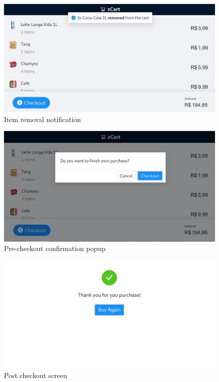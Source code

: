 \begin{figure}[H]
	\centering
	\caption[Item removal notification]{Item removal notification}
	\includegraphics[width=1\textwidth]{./images/userapp3.png}
    \fonte{}
\end{figure}

\begin{figure}[H]
	\centering
	\caption[Pre-checkout confirmation popup]{Pre-checkout confirmation popup}
	\includegraphics[width=1\textwidth]{./images/userapp4.png}
    \fonte{}
\end{figure}

\begin{figure}[H]
	\centering
	\caption[Post checkout screen]{Post checkout screen}
	\includegraphics[width=1\textwidth]{./images/userapp5.png}
    \fonte{}
\end{figure}
